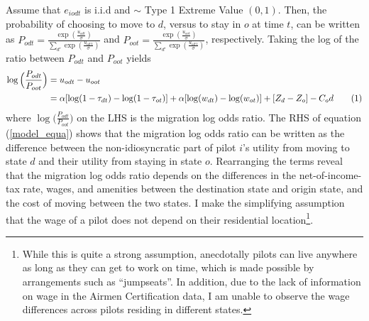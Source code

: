 \documentclass[11pt]{article}
\newcommand\numberthis{\addtocounter{equation}{1}\tag{\theequation}}
\begin{document}
Assume that $e_{iodt}$ is i.i.d and $\sim$ Type 1 Extreme Value $(0, 1)$. Then, the probability of choosing to move to $d$, versus to stay in $o$ at time $t$, can be written as $P_{odt} = \frac{\exp(\frac{u_{odt}}{\sigma})}{\sum_{d'} \exp(\frac{u_{od't}}{\sigma})}$ and $P_{oot} = \frac{\exp(\frac{u_{oot}}{\sigma})}{\sum_{d'} \exp(\frac{u_{od't}}{\sigma})}$, respectively. Taking the log of the ratio between $P_{odt}$ and $P_{oot}$ yields
\begin{align*}\label{model_equa}
	 \log \Big(\frac{P_{odt}}{P_{oot}}\Big) & = u_{odt} - u_{oot} \\
	 & = \alpha [\log(1 - \tau_{dt}) - \log(1 - \tau_{ot})] + \alpha [\log(w_{dt}) - \log(w_{ot})]+ [Z_d - Z_o]  -C_od \numberthis
\end{align*}
\noindent
where $\log \Big(\frac{P_{odt}}{P_{oot}}\Big)$ on the LHS is the migration log odds ratio. The RHS of equation (\ref{model_equa}) shows that the migration log odds ratio can be written as the difference between the non-idiosyncratic part of pilot $i$'s utility from moving to state $d$ and their utility from staying in state $o$. Rearranging the terms reveal that the migration log odds ratio depends on the differences in the net-of-income-tax rate, wages, and amenities between the destination state and origin state, and the cost of moving between the two states. I make the simplifying assumption that the wage of a pilot does not depend on their residential location\footnote{While this is quite a strong assumption, anecdotally pilots can live anywhere as long as they can get to work on time, which is made possible by arrangements such as ``jumpseats''. In addition, due to the lack of information on wage in the Airmen Certification data, I am unable to observe the wage differences across pilots residing in different states.}. \\
\end{document}
